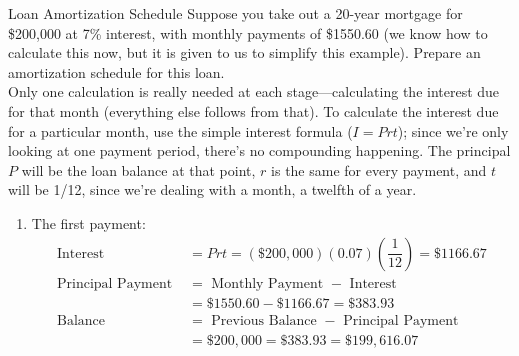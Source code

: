 \begin{example}[https://www.youtube.com/watch?v=bgFXXvgNB0g]{Loan Amortization Schedule}
Suppose you take out a 20-year mortgage for \$200,000 at 7\% interest, with monthly payments of \$1550.60 (we know how to calculate this now, but it is given to us to simplify this example).  Prepare an amortization schedule for this loan.\\

Only one calculation is really needed at each stage---calculating the interest due for that month (everything else follows from that).  To calculate the interest due for a particular month, use the simple interest formula ($I=Prt$); since we're only looking at one payment period, there's no compounding happening.  The principal $P$ will be the loan balance at that point, $r$ is the same for every payment, and $t$ will be 1/12, since we're dealing with a month, a twelfth of a year.
\begin{enumerate}
\item The first payment:
\begin{align*}
\textrm{Interest } &= Prt = (\$200,000)(0.07)\left(\dfrac{1}{12}\right) = \$1166.67\\
\textrm{Principal Payment } &= \textrm{ Monthly Payment } - \textrm{ Interest}\\
&= \$1550.60 - \$1166.67 = \$383.93\\
\textrm{Balance } &= \textrm{ Previous Balance } - \textrm{ Principal Payment}\\
&= \$200,000 = \$383.93 = \$199,616.07
\end{align*}


\end{enumerate}
\end{example}

